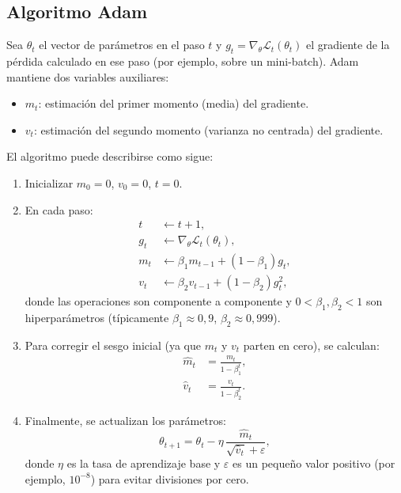 \subsection{Algoritmo Adam}

Sea $\theta_t$ el vector de parámetros en el paso $t$ y $g_t = \nabla_\theta \mathcal{L}_t(\theta_t)$ el gradiente de la pérdida calculado en ese paso (por ejemplo, sobre un mini-batch). Adam mantiene dos variables auxiliares:
\begin{itemize}
    \item $m_t$: estimación del primer momento (media) del gradiente.
    \item $v_t$: estimación del segundo momento (varianza no centrada) del gradiente.
\end{itemize}

El algoritmo puede describirse como sigue:

\begin{enumerate}
    \item Inicializar $m_0 = 0$, $v_0 = 0$, $t = 0$.
    \item En cada paso:
    \begin{align}
        t &\leftarrow t + 1, \\
        g_t &\leftarrow \nabla_\theta \mathcal{L}_t(\theta_t), \\
        m_t &\leftarrow \beta_1 m_{t-1} + (1 - \beta_1) g_t, \\
        v_t &\leftarrow \beta_2 v_{t-1} + (1 - \beta_2) g_t^2,
    \end{align}
    donde las operaciones son componente a componente y $0 < \beta_1, \beta_2 < 1$ son hiperparámetros (típicamente $\beta_1 \approx 0{,}9$, $\beta_2 \approx 0{,}999$).
    \item Para corregir el sesgo inicial (ya que $m_t$ y $v_t$ parten en cero), se calculan:
    \begin{align}
        \hat{m}_t &= \frac{m_t}{1 - \beta_1^{t}}, \\
        \hat{v}_t &= \frac{v_t}{1 - \beta_2^{t}}.
    \end{align}
    \item Finalmente, se actualizan los parámetros:
    \begin{equation}
        \theta_{t+1}
        = \theta_t - \eta \, \frac{\hat{m}_t}{\sqrt{\hat{v}_t} + \varepsilon},
    \end{equation}
    donde $\eta$ es la tasa de aprendizaje base y $\varepsilon$ es un pequeño valor positivo (por ejemplo, $10^{-8}$) para evitar divisiones por cero.
\end{enumerate}

